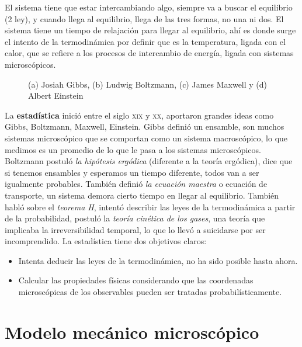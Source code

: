 \documentclass[11pt,fleqn]{book}
\begin{document}
El sistema tiene que estar intercambiando algo, siempre va a buscar el equilibrio (2 ley), y cuando llega al equilibrio, llega de las tres formas, no una ni dos. El sistema tiene un tiempo de relajación para llegar al equilibrio, ahí es donde surge el  intento de la termodinámica por definir que es la temperatura, ligada con el calor, que se refiere a los procesos de intercambio de energía, ligada con sistemas microscópicos.

\begin{figure}[H]
    \centering
    \caption{(a) Josiah Gibbs, (b) Ludwig Boltzmann, (c) James Maxwell y (d) Albert Einstein }
\end{figure}

La \textbf{estadística} inició entre el siglo \textsc{xix} y \textsc{xx}, aportaron grandes ideas como Gibbs, Boltzmann, Maxwell, Einstein. Gibbs definió un ensamble, son muchos sistemas microscópico que se comportan como un sistema macroscópico, lo que medimos es un promedio de lo que le pasa a los sistemas microscópicos. Boltzmann postuló \textit{la hipótesis ergódica} (diferente a la teoría ergódica), dice que si tenemos ensambles y esperamos un tiempo diferente, todos van a ser igualmente probables. También definió \textit{la ecuación maestra} o ecuación de transporte, un sistema demora cierto tiempo en llegar al equilibrio. También habló sobre el \textit{teorema H}, intentó describir las leyes de la termodinámica a partir de la probabilidad, postuló la \textit{teoría cinética de los gases}, una teoría que implicaba la irreversibilidad temporal, lo que lo llevó a suicidarse por ser incomprendido. La estadística tiene dos objetivos claros:

\begin{itemize}
    \item Intenta deducir las leyes de la termodinámica, no ha sido posible hasta ahora.
    \item Calcular las propiedades físicas considerando que las coordenadas microscópicas de los observables pueden ser tratadas probabilísticamente.
\end{itemize}

\section{Modelo mecánico microscópico}
\end{document}
